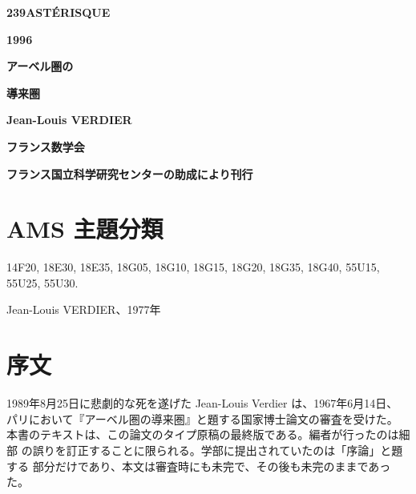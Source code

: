 \begin{titlepage}
  \centering
  {\Huge\bfseries 239\hfill ASTÉRISQUE\par}
  \vspace{1.5em}
  {\LARGE\bfseries 1996\par}
  \vfill
  {\Huge\bfseries アーベル圏の\par}
  \vspace{0.4em}
  {\Huge\bfseries 導来圏\par}
  \vspace{3em}
  {\Large\bfseries Jean-Louis VERDIER\par}
  \vfill
  {\Large\bfseries フランス数学会\par}
  \smallskip
  {\small\bfseries フランス国立科学研究センターの助成により刊行\par}
\end{titlepage}

\chapter*{AMS 主題分類}

14F20, 18E30, 18E35, 18G05, 18G10, 18G15, 18G20, 18G35,
18G40, 55U15, 55U25, 55U30.

\clearpage
{}
\thispagestyle{empty}
\vspace*{0.62\textheight}
\begin{center}
Jean-Louis VERDIER、1977年
\end{center}

\clearpage
{}
\thispagestyle{empty}
\null
\clearpage

\chapter*{序文}

1989年8月25日に悲劇的な死を遂げた Jean-Louis Verdier は、1967年6月14日、
パリにおいて『アーベル圏の導来圏』と題する国家博士論文の審査を受けた。
本書のテキストは、この論文のタイプ原稿の最終版である。編者が行ったのは細部
の誤りを訂正することに限られる。学部に提出されていたのは「序論」と題する
部分だけであり、本文は審査時にも未完で、その後も未完のままであった。


